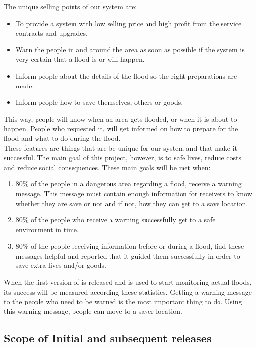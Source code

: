 The unique selling points of our system are: 
\begin{itemize}
	\item To provide a system with low selling price and high profit from the service contracts and upgrades.
	\item Warn the people in and around the area as soon as possible if the system is very certain that a flood is or will happen.
	\item Inform people about the details of the flood so the right preparations are made. 
	\item Inform people how to save themselves, others or goods.
\end{itemize}

This way, people will know when an area gets flooded, or when it is about to happen. People who requested it, will get informed on how to prepare for the flood and what to do during the flood.\\
These features are things that are be unique for our system and that make it successful. The main goal of this project, however, is to safe lives, reduce costs and reduce social consequences. These main goals will be met when:
\begin{enumerate}
	\item 80\% of the people in a dangerous area regarding a flood, receive a warning message. This message must contain enough information for receivers to know whether they are save or not and if not, how they can get to a save location.
	\item 80\% of the people who receive a warning successfully get to a safe environment in time.
	\item 80\% of the people receiving information before or during a flood, find these messages helpful and reported that it guided them successfully in order to save extra lives and/or goods.
\end{enumerate}

When the first version of \ProjectName{} is released and is used to start monitoring actual floods, its success will be measured according these statistics. Getting a warning message to the people who need to be warned is the most important thing to do. Using this warning message, people can move to a saver location.

\subsection{Scope of Initial and subsequent releases}

